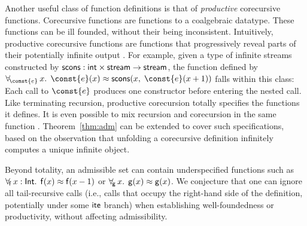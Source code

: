 
Another useful class of function definitions is that of
\emph{productive} corecursive functions. Corecursive functions are functions to
a coalgebraic datatype. These functions can be ill founded, without
their being inconsistent. 
Intuitively, productive corecursive functions are functions that
progressively reveal parts of their potentially infinite
output \cite{turner-1995,mcbride-productive}.
For example, given a type of infinite streams constructed by
$\mathsf{scons} : \mathsf{int} \times \mathsf{stream} \to \mathsf{stream}$,
the function defined by
$\forallf{\const{e}} x.\;\, \const{e}(x) \teq \con{scons}(x,\; \const{e}(x + 1))$
falls within this class: Each call to $\const{e}$ produces one
constructor before entering the nested call. Like terminating recursion,
productive corecursion totally specifies the functions it defines.
It is even possible to mix recursion and corecursion in the same function
\cite{blanchette-et-al-2015-fouco}. Theorem~\ref{thm:adm} can be extended to
cover such specifications, based on the observation that unfolding
a corecursive definition infinitely computes a unique infinite object.

\begin{rep}
Beyond totality, an admissible set can contain underspecified functions
such as $\forall_{\!\mathsf{f}\:} x : \mathsf{Int}.\allowbreak\;\, \mathsf{f}( x )
\approx \mathsf{f}( x - 1 )$ or $\forall_{\!\mathsf{g}\:} x.\allowbreak\;\, \mathsf{g}( x
) \approx \mathsf{g}( x )$. We conjecture that one can ignore all
tail-recursive calls (i.e., calls that occupy the right-hand side of the
definition, potentially under some $\mathsf{ite}$ branch) when establishing well-foundedness
or productivity, without affecting admissibility.
\end{rep}

\newcommand\badassex{
 \{\forallf{\con{f}} x : \typeint.\;\, \con{f}( x ) \teq \con{f}( x ),\allowbreak\;\,
 \forallf{\con{g}} x : \typeint.\;\, \con{g}( x ) \teq \con{g}( x ) + \nobreak\con{f}( x )\}}

